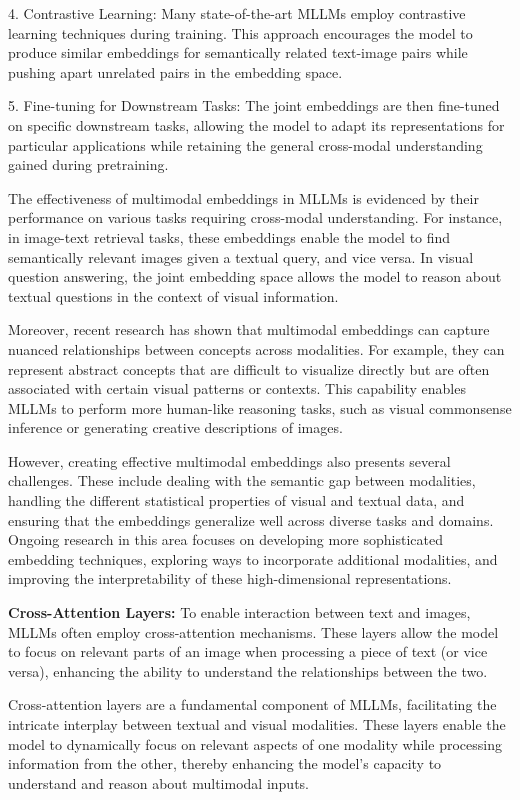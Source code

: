 4. Contrastive Learning: Many state-of-the-art MLLMs employ contrastive learning techniques during training. This approach encourages the model to produce similar embeddings for semantically related text-image pairs while pushing apart unrelated pairs in the embedding space.

5. Fine-tuning for Downstream Tasks: The joint embeddings are then fine-tuned on specific downstream tasks, allowing the model to adapt its representations for particular applications while retaining the general cross-modal understanding gained during pretraining.

The effectiveness of multimodal embeddings in MLLMs is evidenced by their performance on various tasks requiring cross-modal understanding. For instance, in image-text retrieval tasks, these embeddings enable the model to find semantically relevant images given a textual query, and vice versa. In visual question answering, the joint embedding space allows the model to reason about textual questions in the context of visual information.

Moreover, recent research has shown that multimodal embeddings can capture nuanced relationships between concepts across modalities. For example, they can represent abstract concepts that are difficult to visualize directly but are often associated with certain visual patterns or contexts. This capability enables MLLMs to perform more human-like reasoning tasks, such as visual commonsense inference or generating creative descriptions of images.

However, creating effective multimodal embeddings also presents several challenges. These include dealing with the semantic gap between modalities, handling the different statistical properties of visual and textual data, and ensuring that the embeddings generalize well across diverse tasks and domains. Ongoing research in this area focuses on developing more sophisticated embedding techniques, exploring ways to incorporate additional modalities, and improving the interpretability of these high-dimensional representations.


\textbf{Cross-Attention Layers:} To enable interaction between text and images, MLLMs often employ cross-attention mechanisms. These layers allow the model to focus on relevant parts of an image when processing a piece of text (or vice versa), enhancing the ability to understand the relationships between the two.

Cross-attention layers are a fundamental component of MLLMs, facilitating the intricate interplay between textual and visual modalities. These layers enable the model to dynamically focus on relevant aspects of one modality while processing information from the other, thereby enhancing the model's capacity to understand and reason about multimodal inputs.

